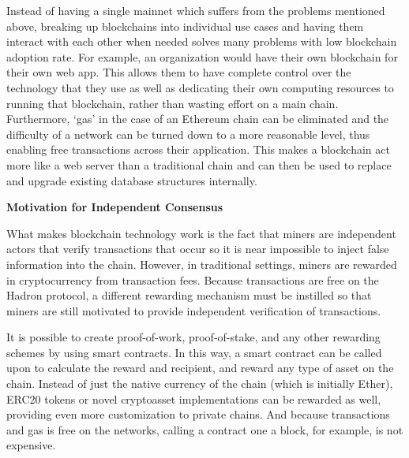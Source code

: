 \documentclass{%
	article}
\begin{document}
Instead of having a single mainnet which suffers from the problems mentioned above, breaking up blockchains into individual use cases and having them interact with each other when needed solves many problems with low blockchain adoption rate. For example, an organization would have their own blockchain for their own web app. This allows them to have complete control over the technology that they use as well as dedicating their own computing resources to running that blockchain, rather than wasting effort on a main chain. Furthermore, ‘gas’ in the case of an Ethereum chain can be eliminated and the difficulty of a network can be turned down to a more reasonable level, thus enabling free transactions across their application. This makes a blockchain act more like a web server than a traditional chain and can then be used to replace and upgrade existing database structures internally.

\begin{center}
\textbf{Motivation for Independent Consensus}
\end{center}

What makes blockchain technology work is the fact that miners are independent actors that verify transactions that occur so it is near impossible to inject false information into the chain. However, in traditional settings, miners are rewarded in cryptocurrency from transaction fees. Because transactions are free on the Hadron protocol, a different rewarding mechanism must be instilled so that miners are still motivated to provide independent verification of transactions.

It is possible to create proof-of-work, proof-of-stake, and any other rewarding schemes by using smart contracts. In this way, a smart contract can be called upon to calculate the reward and recipient, and reward any type of asset on the chain. Instead of just the native currency of the chain (which is initially Ether), ERC20 tokens or novel cryptoasset implementations can be rewarded as well, providing even more customization to private chains. And because transactions and gas is free on the networks, calling a contract one a block, for example, is not expensive.
\end{document}
